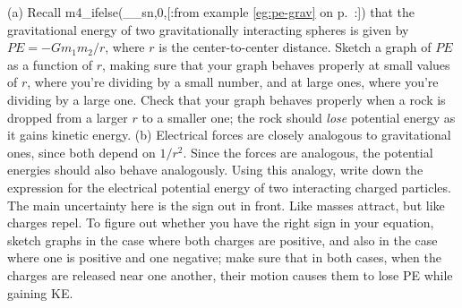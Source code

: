         (a) Recall m4_ifelse(__sn,0,[:from example \ref{eg:pe-grav} on p.~\pageref{eg:pe-grav}:]) that the gravitational energy of two gravitationally
        interacting spheres is given by $PE=-Gm_1m_2/r$, where $r$ is the
        center-to-center distance. Sketch a graph of $PE$ as a function of $r$,
        making sure that your graph behaves properly at small values of $r$,
        where you're dividing by a small number, and at large ones, where you're
        dividing by a large one. Check that your graph behaves properly when a
        rock is dropped from a larger $r$ to a smaller one; the rock should \emph{lose}
        potential energy as it gains kinetic energy.\hwendpart
(b) Electrical forces are closely analogous to gravitational ones, since both
depend on $1/r^2$. Since the forces are analogous, the potential energies should
also behave analogously. Using this analogy, write down the expression for the
electrical potential energy of two interacting charged particles. The main uncertainty
here is the sign out in front. Like masses attract, but like charges repel. To figure out whether you
have the right sign  in your equation, sketch graphs in the case where both charges are positive,
and also in the case where one is positive and one negative; make sure that in both cases, when the
charges are released near one another, their motion causes them to lose PE while gaining KE.\answercheck
